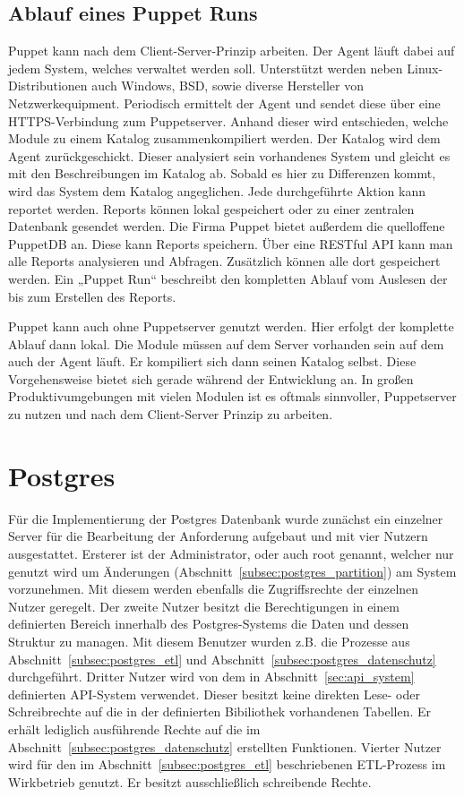 \subsection{Ablauf eines Puppet Runs}
Puppet kann nach dem \gls{Client-Server}-Prinzip arbeiten. Der Agent läuft
dabei auf jedem System, welches verwaltet werden soll. Unterstützt werden neben
Linux\hyp{}Distributionen auch Windows, BSD, sowie diverse Hersteller von
Netzwerkequipment. Periodisch ermittelt der Agent  und
sendet diese über eine \gls{HTTPS}-Verbindung zum Puppetserver. Anhand dieser
 wird entschieden, welche Module zu einem Katalog
zusammenkompiliert werden. Der Katalog wird dem Agent zurückgeschickt. Dieser
analysiert sein vorhandenes System und gleicht es mit den Beschreibungen im
Katalog ab. Sobald es hier zu Differenzen kommt, wird das System dem Katalog
angeglichen. Jede durchgeführte Aktion kann reportet werden. Reports können
lokal gespeichert oder zu einer zentralen Datenbank gesendet werden. Die Firma
Puppet bietet außerdem die quelloffene PuppetDB an. Diese kann Reports
speichern. Über eine \gls{RESTful} \gls{API} kann man alle Reports analysieren
und Abfragen. Zusätzlich können alle  dort gespeichert
werden. Ein „Puppet Run“ beschreibt den kompletten Ablauf vom Auslesen der
 bis zum Erstellen des Reports.

Puppet kann auch ohne Puppetserver genutzt werden. Hier erfolgt der komplette
Ablauf dann lokal. Die Module müssen auf dem Server vorhanden sein auf dem auch
der Agent läuft. Er kompiliert sich dann seinen Katalog selbst. Diese
Vorgehensweise bietet sich gerade während der Entwicklung an. In großen
Produktivumgebungen mit vielen Modulen ist es oftmals sinnvoller, Puppetserver
zu nutzen und nach dem Client\hyp{}Server Prinzip zu arbeiten.
\tm%

\section{Postgres}
Für die Implementierung der Postgres Datenbank wurde zunächst ein einzelner
Server für die Bearbeitung der Anforderung aufgebaut und mit vier Nutzern
ausgestattet. Ersterer ist der Administrator, oder auch root genannt, welcher
nur genutzt wird um Änderungen (Abschnitt~\ref{subsec:postgres_partition}) am
System vorzunehmen. Mit diesem werden ebenfalls die Zugriffsrechte der
einzelnen Nutzer geregelt. Der zweite Nutzer besitzt die Berechtigungen in
einem definierten Bereich innerhalb des Postgres\hyp{}Systems die Daten und
dessen Struktur zu managen. Mit diesem Benutzer wurden z.B. die Prozesse aus
Abschnitt~\ref{subsec:postgres_etl} und
Abschnitt~\ref{subsec:postgres_datenschutz} durchgeführt. Dritter Nutzer wird
von dem in Abschnitt~\ref{sec:api_system} definierten \gls{API}\hyp{}System
verwendet. Dieser besitzt keine direkten Lese\hyp{} oder Schreibrechte auf die
in der definierten Bibiliothek vorhandenen Tabellen. Er erhält lediglich
ausführende Rechte auf die im Abschnitt~\ref{subsec:postgres_datenschutz}
erstellten Funktionen. Vierter Nutzer wird für den im
Abschnitt~\ref{subsec:postgres_etl} beschriebenen ETL\hyp{}Prozess im
Wirkbetrieb genutzt. Er besitzt ausschließlich schreibende Rechte.

